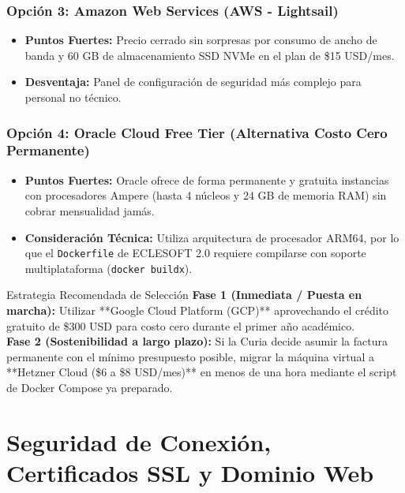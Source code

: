 \documentclass[11pt,a4paper]{article}
\begin{document}
\subsubsection{Opción 3: Amazon Web Services (AWS - Lightsail)}
\begin{itemize}[leftmargin=1cm]
    \item \textbf{Puntos Fuertes:} Precio cerrado sin sorpresas por consumo de ancho de banda y 60 GB de almacenamiento SSD NVMe en el plan de \$15 USD/mes.
    \item \textbf{Desventaja:} Panel de configuración de seguridad más complejo para personal no técnico.
\end{itemize}

\subsubsection{Opción 4: Oracle Cloud Free Tier (Alternativa Costo Cero Permanente)}
\begin{itemize}[leftmargin=1cm]
    \item \textbf{Puntos Fuertes:} Oracle ofrece de forma permanente y gratuita instancias con procesadores Ampere (hasta 4 núcleos y 24 GB de memoria RAM) sin cobrar mensualidad jamás.
    \item \textbf{Consideración Técnica:} Utiliza arquitectura de procesador ARM64, por lo que el \texttt{Dockerfile} de ECLESOFT 2.0 requiere compilarse con soporte multiplataforma (\texttt{docker buildx}).
\end{itemize}

\begin{destacadobox}{Estrategia Recomendada de Selección}
\textbf{Fase 1 (Inmediata / Puesta en marcha):} Utilizar **Google Cloud Platform (GCP)** aprovechando el crédito gratuito de \$300 USD para costo cero durante el primer año académico.\\
\textbf{Fase 2 (Sostenibilidad a largo plazo):} Si la Curia decide asumir la factura permanente con el mínimo presupuesto posible, migrar la máquina virtual a **Hetzner Cloud (\$6 a \$8 USD/mes)** en menos de una hora mediante el script de Docker Compose ya preparado.
\end{destacadobox}

\section{Seguridad de Conexión, Certificados SSL y Dominio Web}
\end{document}
